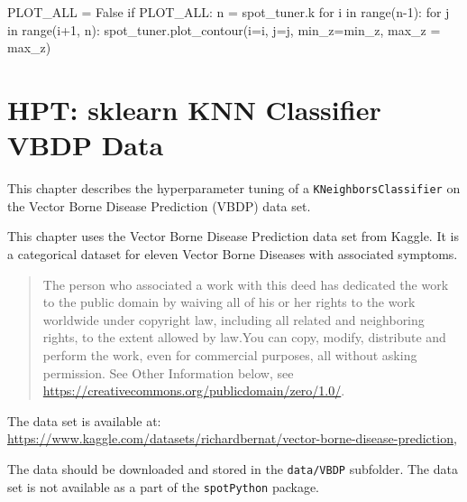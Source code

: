 \documentclass[
  letterpaper,
  DIV=11,
  numbers=noendperiod]{scrreprt}
\newenvironment{Shaded}{\begin{snugshade}}{\end{snugshade}}
\newcommand{\BuiltInTok}[1]{\textcolor[rgb]{0.00,0.23,0.31}{#1}}
\newcommand{\ControlFlowTok}[1]{\textcolor[rgb]{0.00,0.23,0.31}{#1}}
\newcommand{\DecValTok}[1]{\textcolor[rgb]{0.68,0.00,0.00}{#1}}
\newcommand{\KeywordTok}[1]{\textcolor[rgb]{0.00,0.23,0.31}{#1}}
\newcommand{\NormalTok}[1]{\textcolor[rgb]{0.00,0.23,0.31}{#1}}
\newcommand{\OperatorTok}[1]{\textcolor[rgb]{0.37,0.37,0.37}{#1}}
\newcommand{\VariableTok}[1]{\textcolor[rgb]{0.07,0.07,0.07}{#1}}
\begin{document}
\begin{Shaded}
\begin{Highlighting}[]
\NormalTok{PLOT\_ALL }\OperatorTok{=} \VariableTok{False}
\ControlFlowTok{if}\NormalTok{ PLOT\_ALL:}
\NormalTok{    n }\OperatorTok{=}\NormalTok{ spot\_tuner.k}
    \ControlFlowTok{for}\NormalTok{ i }\KeywordTok{in} \BuiltInTok{range}\NormalTok{(n}\OperatorTok{{-}}\DecValTok{1}\NormalTok{):}
        \ControlFlowTok{for}\NormalTok{ j }\KeywordTok{in} \BuiltInTok{range}\NormalTok{(i}\OperatorTok{+}\DecValTok{1}\NormalTok{, n):}
\NormalTok{            spot\_tuner.plot\_contour(i}\OperatorTok{=}\NormalTok{i, j}\OperatorTok{=}\NormalTok{j, min\_z}\OperatorTok{=}\NormalTok{min\_z, max\_z }\OperatorTok{=}\NormalTok{ max\_z)}
\end{Highlighting}
\end{Shaded}

\hypertarget{sec-hpt-sklearn-knn-classifier-vbdp-data}{%
\chapter{HPT: sklearn KNN Classifier VBDP
Data}\label{sec-hpt-sklearn-knn-classifier-vbdp-data}}

This chapter describes the hyperparameter tuning of a
\texttt{KNeighborsClassifier} on the Vector Borne Disease Prediction
(VBDP) data set.

\begin{tcolorbox}[enhanced jigsaw, left=2mm, title=\textcolor{quarto-callout-important-color}{\faExclamation}\hspace{0.5em}{Vector Borne Disease Prediction Data Set}, bottomrule=.15mm, titlerule=0mm, breakable, rightrule=.15mm, toprule=.15mm, coltitle=black, colbacktitle=quarto-callout-important-color!10!white, leftrule=.75mm, arc=.35mm, colframe=quarto-callout-important-color-frame, bottomtitle=1mm, colback=white, opacitybacktitle=0.6, toptitle=1mm, opacityback=0]

This chapter uses the Vector Borne Disease Prediction data set from
Kaggle. It is a categorical dataset for eleven Vector Borne Diseases
with associated symptoms.

\begin{quote}
The person who associated a work with this deed has dedicated the work
to the public domain by waiving all of his or her rights to the work
worldwide under copyright law, including all related and neighboring
rights, to the extent allowed by law.You can copy, modify, distribute
and perform the work, even for commercial purposes, all without asking
permission. See Other Information below, see
\url{https://creativecommons.org/publicdomain/zero/1.0/}.
\end{quote}

The data set is available at:
\url{https://www.kaggle.com/datasets/richardbernat/vector-borne-disease-prediction},

The data should be downloaded and stored in the \texttt{data/VBDP}
subfolder. The data set is not available as a part of the
\texttt{spotPython} package.

\end{tcolorbox}
\end{document}
